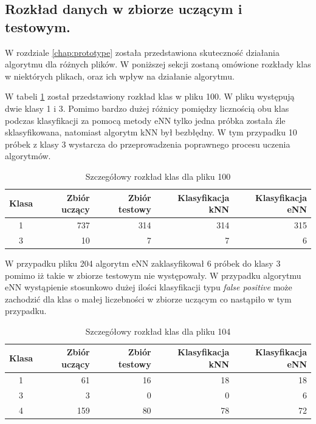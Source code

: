 \subsection{Rozkład danych w zbiorze uczącym i testowym.}
W rozdziale \ref{chap:prototype} została przedstawiona skuteczność działania algorytmu dla różnych plików. W poniższej sekcji zostaną omówione rozkłady klas w niektórych plikach, oraz ich wpływ na działanie algorytmu.


W tabeli \ref{tab:matlab-plik100} został przedstawiony rozkład klas w pliku 100. W pliku występują dwie klasy 1 i 3. Pomimo bardzo dużej różnicy pomiędzy licznością obu klas podczas klasyfikacji za pomocą metody eNN tylko jedna próbka została źle sklasyfikowana, natomiast algorytm kNN był bezbłędny. W tym przypadku 10 próbek z klasy 3 wystarcza do przeprowadzenia poprawnego procesu uczenia algorytmów.

\begin{table}[H]
	\centering
	\begin{tabular}{|c|r|r|r|r|}
		\hline
		
		Klasa & Zbiór uczący & Zbiór testowy & Klasyfikacja kNN & Klasyfikacja eNN \\
		\hline
		1 & 737 & 314 & 314 & 315 \\
		\hline 
		3 & 10 & 7 & 7 & 6 \\
		\hline
                          
	\end{tabular}
	\caption{Szczegółowy rozkład klas dla pliku 100}
	\label{tab:matlab-plik100}
\end{table}

W przypadku pliku 204 algorytm eNN zaklasyfikował 6 próbek do klasy 3 pomimo iż takie w zbiorze testowym nie występowały. W przypadku algorytmu eNN wystąpienie stosunkowo dużej ilości klasyfikacji typu \textit{false positive} może zachodzić dla klas o małej liczebności w zbiorze uczącym co nastąpiło w tym przypadku.

\begin{table}[H]
	\centering
	\begin{tabular}{|c|r|r|r|r|}
		\hline
		
		Klasa & Zbiór uczący & Zbiór testowy & Klasyfikacja kNN & Klasyfikacja eNN \\
		\hline
		1 & 61 & 16 & 18 & 18 \\
		\hline 
		3 & 3 & 0 & 0 & 6 \\
		\hline
		4 & 159 & 80 & 78 & 72 \\
		\hline
		
	\end{tabular}
	\caption{Szczegółowy rozkład klas dla pliku 104}
	\label{tab:matlab-plik104}
\end{table}


